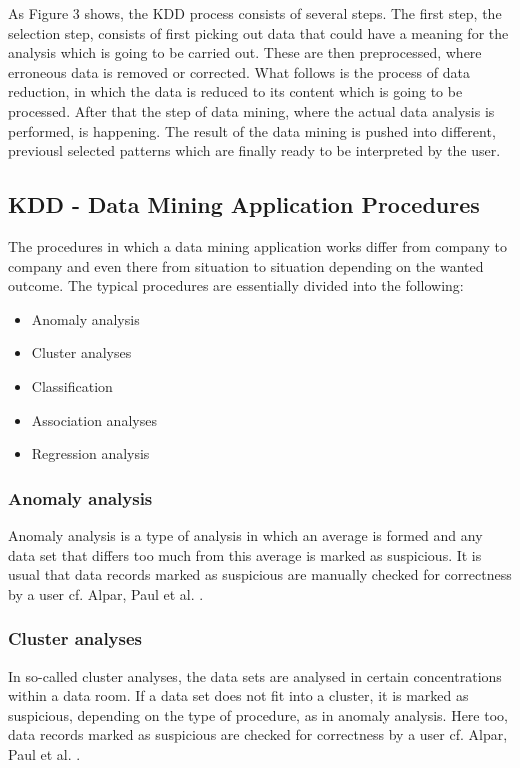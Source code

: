 \documentclass[12pt,twocolumn,twoside]{conference}   %
\begin{document}
As Figure 3 shows, the KDD process consists of several steps. The first step, the selection step, consists of first picking out data that could have a meaning for the analysis which is going to be carried out. These are then preprocessed, where erroneous data is removed or corrected. What follows is the process of data reduction, in which the data is reduced to its content which is going to be processed. After that the step of data mining, where the actual data analysis is performed, is happening. The result of the data mining is pushed into different, previousl selected patterns which are finally ready to be interpreted by the user.


\subsection{KDD - Data Mining Application Procedures}
The procedures in which a data mining application works differ from company to company and even there from situation to situation depending on the wanted outcome. The typical procedures are essentially divided into the following:

\begin{itemize}
\item Anomaly analysis
\item Cluster analyses
\item Classification
\item Association analyses
\item Regression analysis
\end{itemize}

\subsubsection{Anomaly analysis}
Anomaly analysis is a type of analysis in which an average is formed and any data set that differs too much from this average is marked as suspicious. It is usual that data records marked as suspicious are manually checked for correctness by a user {cf. Alpar, Paul et al. \cite{14}}.

\subsubsection{Cluster analyses}
In so-called cluster analyses, the data sets are analysed in certain concentrations within a data room. If a data set does not fit into a cluster, it is marked as suspicious, depending on the type of procedure, as in anomaly analysis. Here too, data records marked as suspicious are checked for correctness by a user {cf. Alpar, Paul et al. \cite{14}}.
\end{document}
